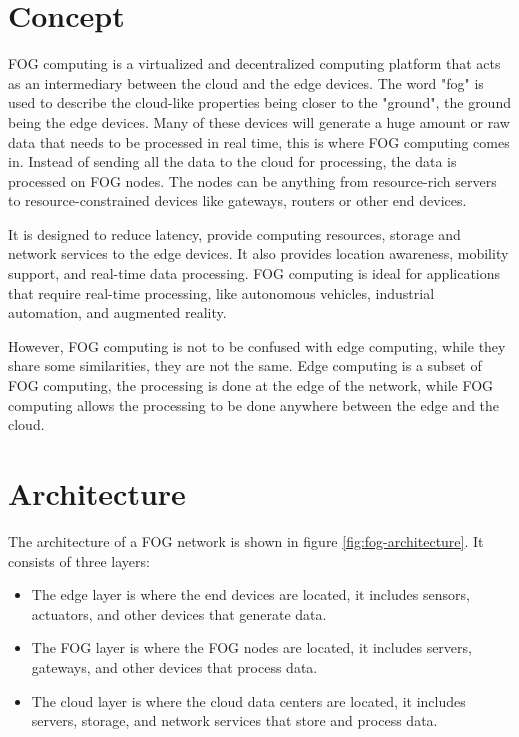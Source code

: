 \section{Concept}
\label{sec:fog-concept}

FOG computing is a virtualized and decentralized computing platform that acts as an intermediary between the cloud and
the edge devices. The word "fog" is used to describe the cloud-like properties being closer to the "ground", the ground
being the edge devices. Many of these devices will generate a huge amount or raw data that needs to be processed in real
time, this is where FOG computing comes in. Instead of sending all the data to the cloud for processing, the data is
processed on FOG nodes. The nodes can be anything from resource-rich servers to resource-constrained devices like
gateways, routers or other end devices.

It is designed to reduce latency, provide computing resources, storage and network services to the edge devices. It also
provides location awareness, mobility support, and real-time data processing. FOG computing is ideal for applications that
require real-time processing, like autonomous vehicles, industrial automation, and augmented reality.

However, FOG computing is not to be confused with edge computing, while they share some similarities, they are not the
same. Edge computing is a subset of FOG computing, the processing is done at the edge of the network, while FOG computing
allows the processing to be done anywhere between the edge and the cloud.

\section{Architecture}
\label{sec:fog-architecture}

The architecture of a FOG network is shown in figure \ref{fig:fog-architecture}. It consists of three layers:
\begin{itemize}
	\item The edge layer is where the end devices are located, it includes sensors, actuators, and other devices that
	      generate data.
	\item The FOG layer is where the FOG nodes are located, it includes servers, gateways, and other devices that
	      process data.
	\item The cloud layer is where the cloud data centers are located, it includes servers, storage, and network
	      services that store and process data.
\end{itemize}

